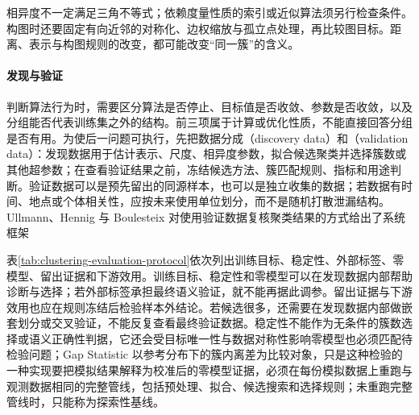 相异度不一定满足三角不等式；依赖度量性质的索引或近似算法须另行检查条件。构图时还要固定有向近邻的对称化、边权缩放与孤立点处理，再比较图目标。距离、表示与构图规则的改变，都可能改变“同一簇”的含义。

\paragraph{发现与验证}
判断算法行为时，需要区分算法是否停止、目标值是否收敛、参数是否收敛，以及分组能否代表训练集之外的结构。前三项属于计算或优化性质，不能直接回答分组是否有用。为使后一问题可执行，先把数据分成（discovery data）和（validation data）：发现数据用于估计表示、尺度、相异度参数，拟合候选聚类并选择簇数或其他超参数；在查看验证结果之前，冻结候选方法、簇匹配规则、指标和用途判断。验证数据可以是预先留出的同源样本，也可以是独立收集的数据；若数据有时间、地点或个体相关性，应按未来使用单位划分，而不是随机打散泄漏结构。Ullmann、Hennig 与 Boulesteix 对使用验证数据复核聚类结果的方式给出了系统框架

表\ref{tab:clustering-evaluation-protocol}依次列出训练目标、稳定性、外部标签、零模型、留出证据和下游效用。训练目标、稳定性和零模型可以在发现数据内部帮助诊断与选择；若外部标签承担最终语义验证，就不能再据此调参。留出证据与下游效用也应在规则冻结后检验样本外结论。若候选很多，还需要在发现数据内部做嵌套划分或交叉验证，不能反复查看最终验证数据。稳定性不能作为无条件的簇数选择或语义正确性判据，它还会受目标唯一性与数据对称性影响零模型也必须匹配待检验问题；Gap Statistic 以参考分布下的簇内离差为比较对象，只是这种检验的一种实现要把模拟结果解释为校准后的零模型证据，必须在每份模拟数据上重跑与观测数据相同的完整管线，包括预处理、拟合、候选搜索和选择规则；未重跑完整管线时，只能称为探索性基线。

